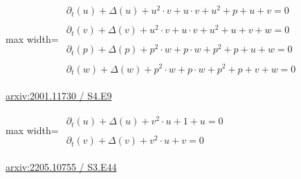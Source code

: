 \documentclass[UTF8,10pt,a4paper,fontset=mac]{ctexart}
\begin{document}
\begin{minipage}{\linewidth}\begin{center}\begin{adjustbox}{max width=\linewidth}$\displaystyle\begin{gathered}\begin{gathered}\partial_{t}(u)+\Delta(u)+u^{2}\cdot v+u\cdot v+u^{2}+p+u+v=0\end{gathered}\\[5pt]\begin{gathered}\partial_{t}(v)+\Delta(v)+u^{2}\cdot v+u\cdot v+u^{2}+u+v+w=0\end{gathered}\\[5pt]\begin{gathered}\partial_{t}(p)+\Delta(p)+p^{2}\cdot w+p\cdot w+p^{2}+p+u+w=0\end{gathered}\\[5pt]\begin{gathered}\partial_{t}(w)+\Delta(w)+p^{2}\cdot w+p\cdot w+p^{2}+p+v+w=0\end{gathered}\end{gathered}$\end{adjustbox}\end{center}{\small\href{https://arxiv.org/html/2001.11730#S4.E9}{arxiv:2001.11730 / S4.E9}}\par\end{minipage}\par\vspace{6mm}

\begin{minipage}{\linewidth}\begin{center}\begin{adjustbox}{max width=\linewidth}$\displaystyle\begin{gathered}\begin{gathered}\partial_{t}(u)+\Delta(u)+v^{2}\cdot u+1+u=0\end{gathered}\\[5pt]\begin{gathered}\partial_{t}(v)+\Delta(v)+v^{2}\cdot u+v=0\end{gathered}\end{gathered}$\end{adjustbox}\end{center}{\small\href{https://arxiv.org/html/2205.10755#S3.E44}{arxiv:2205.10755 / S3.E44}}\par\end{minipage}\par\vspace{6mm}
\end{document}

